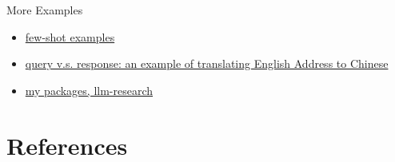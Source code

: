 \documentclass[11.5pt]{beamer}
\begin{document}
\begin{frame}{More Examples}
\begin{itemize}
    \item \href{https://github.com/githubjacky/EPU-LLM/blob/main/scripts/chatgput_cls.py}{few-shot examples}
    \item \href{https://github.com/githubjacky/llm-research/blob/main/examples/english_address_to_chinese/main.ipynb}{query v.s. response: an example of translating English Address to Chinese}
    \item \href{https://github.com/githubjacky/llm-research/blob/main/llm_research/model/base_model.py}{my packages, llm-research}
\end{itemize}
\end{frame}


\section{References}


\begin{frame}[allowframebreaks]{}
\renewcommand{\section}[2]{}%

\end{frame}
\end{document}

